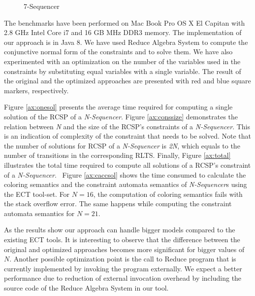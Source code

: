 \begin{figure}[t]
  \begin{center}
      \casestudybc
  \end{center}
  \caption{7-Sequencer}
  \label{fig:nseq}
\end{figure}

The benchmarks have been performed on Mac Book Pro OS X El Capitan with 2.8 GHz Intel Core i7 and 16 GB MHz DDR3 memory. The implementation of our approach is in Java 8. We have used Reduce Algebra System\cite{ReduceBook}  %
to compute the conjunctive normal form of the constraints and to solve them.
We have also experimented with an optimization on the number of the variables used in the constraints by substituting equal variables with a single variable. The result of the original and the optimized approaches are presented with red and blue square markers, respectively.

Figure \ref{ax:onesol} presents the average time required for computing a single solution of the RCSP of a \emph{N-Sequencer}. Figure \ref{ax:conssize} demonstrates the relation between \emph{N} and the size of the RCSP's constraints of a \emph{N-Sequencer}. This is an indication of complexity of the constraint that needs to be solved. Note that the number of solutions for RCSP of a \emph{N-Sequencer} is \emph{2N}, which equals to the number of transitions in the corresponding RLTS. Finally, Figure \ref{ax:total} illustrates the total time required to compute all solutions of a RCSP's constraint of a \emph{N-Sequencer}.
\ 
Figure \ref{ax:caccsol} shows the time consumed to calculate the coloring semantics and the constraint automata semantics of \emph{N-Sequencer}s using the ECT tool-set. For $N=16$, the computation of coloring semantics fails with the stack overflow error. The same happens while computing the constraint automata semantics for $N=21$.  

As the results show our approach can handle bigger models compared to the existing ECT tools. It is interesting to observe that the difference between the original and optimized approaches becomes more significant for bigger values of $N$. Another possible optimization point is the call to Reduce program that is currently implemented by invoking the program externally. We expect a better performance due to reduction of external invocation overhead by including the source code of the Reduce Algebra System in our tool.

